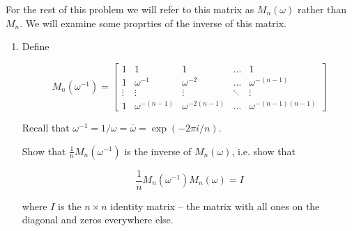 \documentclass[11pt]{article}
\begin{document}
For the rest of this problem we will refer to this matrix as $M_n(\omega)$ rather than $M_n$. We will examine some proprties of the inverse of this matrix.

\begin{enumerate}[label=(\alph*), resume]

\item Define

\[
M_n(\omega^{-1}) = 
\begin{bmatrix}
    1     & 1           & 1            & \dots  & 1 \\
    1     & \omega^{-1}      & \omega^{-2}     & \dots  & \omega^{-(n-1)} \\
    \vdots & \vdots & \vdots & \ddots & \vdots \\
    1     & \omega^{-(n-1)} & \omega^{-2(n-1)} & \dots  & \omega^{-(n-1)(n-1)}
\end{bmatrix}
\]

Recall that $\omega^{-1} = 1/\omega = \bar{\omega} = \exp(-2\pi i / n)$.

Show that $\frac{1}{n} M_n(\omega^{-1})$ is the inverse of $M_n(\omega)$, i.e. show that

\[
\frac{1}{n} M_n(\omega^{-1})M_n(\omega) = I
\]

where $I$ is the $n\times n$ identity matrix -- the matrix with all ones on the diagonal and zeros everywhere else.


\end{enumerate}
\end{document}

